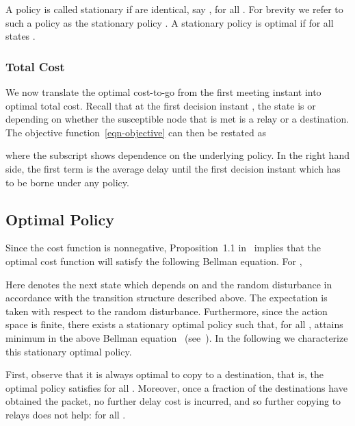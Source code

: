 \documentclass[10pt,journal,letterpaper]{IEEEtran}
\begin{document}
A policy  is called stationary if  are identical, say , for all .
For brevity we refer to such a policy as the stationary policy .
A stationary policy  is optimal if  for all states .


\subsubsection{Total Cost}
We now translate the optimal cost-to-go from the first meeting instant into optimal total cost.
Recall that at the first decision instant , the state
 is  or  depending on whether the susceptible node that is met is a relay
or a destination.
The objective function~\eqref{eqn-objective} can then be restated as

where the subscript  shows dependence on the underlying policy. In the right hand side, the first term  is the average delay until the first decision instant which has to be borne under any policy.


\subsection{Optimal Policy}
\label{sec:opt-policy} Since the cost function  is
nonnegative, Proposition~1.1 in~\cite[Chapter~3]{stochctrl.bertsekas07dpoc-vol2}
implies that the optimal cost function will satisfy the following
Bellman equation. For ,

Here  denotes the next state which depends on  and the random disturbance
in accordance with the
transition structure described above. The expectation is taken with
respect to  the random disturbance. Furthermore, since the action
space is finite, there exists a stationary optimal policy 
such that, for all ,  attains minimum in the above
Bellman equation
~(see~\cite[Chapter~3]{stochctrl.bertsekas07dpoc-vol2}). In the
following we characterize this stationary optimal policy.

First, observe that it is always optimal to copy to a destination, that is, the optimal policy satisfies  for all . Moreover, once a fraction  of the destinations have obtained the packet, no further delay cost is incurred, and so further copying to relays does not help:  for all .
\end{document}
